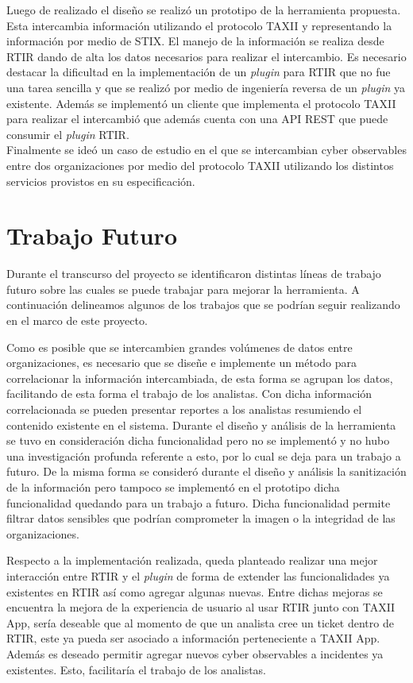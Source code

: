 \bigskip
Luego de realizado el diseño se realizó un prototipo de la herramienta propuesta. Esta intercambia información utilizando el protocolo TAXII y representando la información por medio de STIX. El manejo de la información se realiza desde RTIR dando de alta los datos necesarios para realizar el intercambio. Es necesario destacar la dificultad en la implementación de un \textit{plugin} para RTIR que no fue una tarea sencilla y que se realizó por medio de ingeniería reversa de un \textit{plugin} ya existente. Además se implementó un cliente que implementa el protocolo TAXII para realizar el intercambió que además cuenta con una API REST que puede consumir el \textit{plugin} RTIR.\\
\bigskip
Finalmente se ideó un caso de estudio en el que se intercambian cyber observables entre dos organizaciones por medio del protocolo TAXII utilizando los distintos servicios provistos en su especificación.

\section{Trabajo Futuro}
Durante el transcurso del proyecto se identificaron distintas líneas de trabajo futuro sobre las cuales se puede trabajar para mejorar la herramienta. A continuación delineamos algunos de los trabajos que se podrían seguir realizando en el marco de este proyecto.
\bigskip

Como es posible que se intercambien grandes volúmenes de datos entre organizaciones, es necesario que se diseñe e implemente un método para correlacionar la información intercambiada, de esta forma se agrupan los datos, facilitando de esta forma el trabajo de los analistas. Con dicha información correlacionada se pueden presentar reportes a los analistas resumiendo el contenido existente en el sistema. Durante el diseño y análisis de la herramienta se tuvo en consideración dicha funcionalidad pero no se implementó y no hubo una investigación profunda referente a esto, por lo cual se deja para un trabajo a futuro. 
De la misma forma se consideró durante el diseño y análisis la sanitización de la información pero tampoco se implementó en el prototipo dicha funcionalidad quedando para un trabajo a futuro.  Dicha funcionalidad permite filtrar datos sensibles que podrían comprometer la imagen o la integridad de las organizaciones.
\bigskip

Respecto a la implementación realizada, queda planteado realizar una mejor interacción entre RTIR y el \textit{plugin} de forma de extender las funcionalidades ya existentes en RTIR así como agregar algunas nuevas. Entre dichas mejoras se encuentra la mejora de la experiencia de usuario al usar RTIR junto con TAXII App, sería deseable que al momento de que un analista cree un ticket dentro de RTIR, este ya pueda ser asociado a información perteneciente a TAXII App. Además es deseado permitir agregar nuevos cyber observables a incidentes ya existentes. Esto, facilitaría el trabajo de los analistas.

